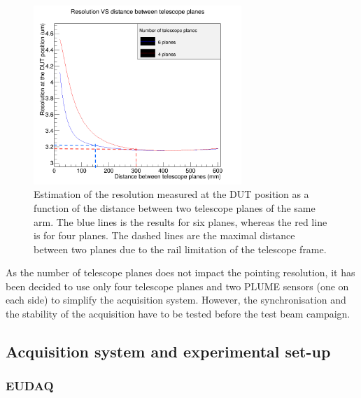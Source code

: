     \begin{figure}[!h]
      \centering
      \includegraphics[width = 0.7\textwidth]{Pictures/X0/resolution_4Vs6planes_4-7GeV.png}
      \caption{Estimation of the resolution measured at the DUT position as a function of the distance between two telescope planes of the same arm.
      The blue lines is the results for six planes, whereas the red line is for four planes. 
      The dashed lines are the maximal distance between two planes due to the rail limitation of the telescope frame.}
      \label{fig:estimationRes4.7GeV}
    \end{figure}

    As the number of telescope planes does not impact the pointing resolution, it has been decided to use only four telescope planes and two \gls{PLUME} sensors (one on each side) to simplify the acquisition system.
    However, the synchronisation and the stability of the acquisition have to be tested before the test beam campaign. 

    \subsection{Acquisition system and experimental set-up}
      
      \subsubsection{EUDAQ}

